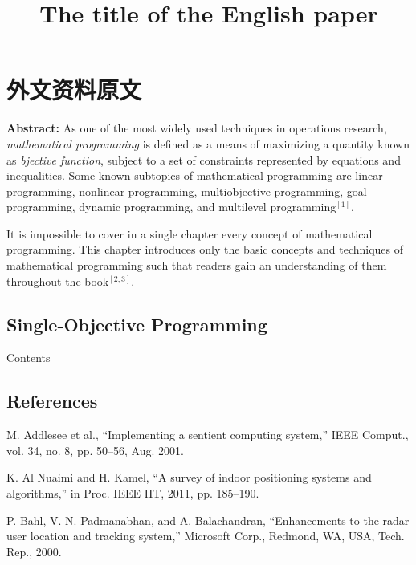 \chapter{外文资料原文}
\label{cha:engorg}

\title{The title of the English paper}

\textbf{Abstract:} As one of the most widely used techniques in operations
research, \emph{ mathematical programming} is defined as a means of maximizing a
quantity known as \emph{bjective function}, subject to a set of constraints
represented by equations and inequalities. Some known subtopics of mathematical
programming are linear programming, nonlinear programming, multiobjective
programming, goal programming, dynamic programming, and multilevel
programming$^{[1]}$.

It is impossible to cover in a single chapter every concept of mathematical
programming. This chapter introduces only the basic concepts and techniques of
mathematical programming such that readers gain an understanding of them
throughout the book$^{[2,3]}$.


\section{Single-Objective Programming}
Contents

\section*{References}
\begin{originbbl}
  \item M. Addlesee et al., ``Implementing a sentient computing system,'' IEEE Comput., vol. 34, no. 8, pp. 50–56, Aug. 2001.
  \item K. Al Nuaimi and H. Kamel, ``A survey of indoor positioning systems and algorithms,'' in Proc. IEEE IIT, 2011, pp. 185–190.
  \item P. Bahl, V. N. Padmanabhan, and A. Balachandran, ``Enhancements to the radar user location and tracking system,'' Microsoft Corp., Redmond, WA, USA, Tech. Rep., 2000. 
\end{originbbl}
